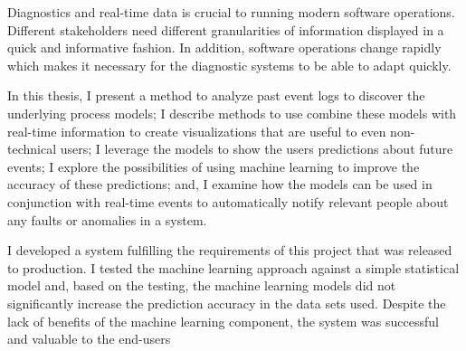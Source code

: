 


\begin{abstractpage}[english]
Diagnostics and real-time data is crucial to running modern software operations.
Different stakeholders need different granularities of information displayed in a quick and informative fashion.
In addition, software operations change rapidly which makes it necessary for the diagnostic systems to be able to adapt quickly.

\vspace{0.8ex}

In this thesis, I present a method to analyze past event logs to discover the underlying process models;
I describe methods to use combine these models with real-time information to create visualizations
that are useful to even non-technical users;
I leverage the models to show the users predictions about future events;
I explore the possibilities of using machine learning to improve the accuracy of these predictions;
and, I examine how the models can be used in conjunction with real-time events to automatically notify relevant people about any faults or anomalies in a system.
 
\vspace{0.8ex}
 
I developed a system fulfilling the requirements of this project that was released to production.
I tested the machine learning approach against a simple statistical model and, based on the testing, the machine learning models did not significantly increase the prediction accuracy in the data sets used.
Despite the lack of benefits of the machine learning component, the system was successful and valuable to the end-users

\end{abstractpage}

\newpage


